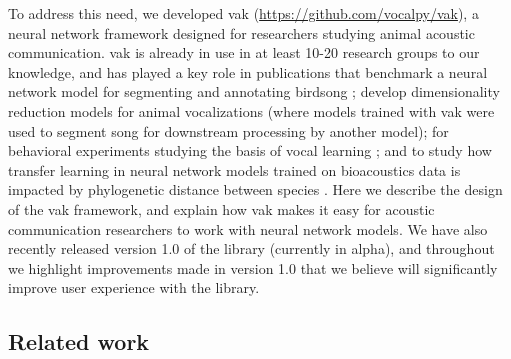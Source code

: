 To address this need, we developed vak \cite{nicholsonVak2022} (\url{https://github.com/vocalpy/vak}), a neural network framework designed for researchers studying animal acoustic communication. vak is already in use in at least 10-20 research groups to our knowledge, and has played a key role in publications that benchmark a neural network model for segmenting and annotating birdsong \cite{cohenAutomatedAnnotationBirdsong2022}; develop dimensionality reduction models for animal vocalizations \cite{goffinetLowdimensionalLearnedFeature2021} (where models trained with vak were used to segment song for downstream processing by another model); for behavioral experiments studying the basis of vocal learning  \cite{mcgregorSharedMechanismsAuditory2022}; and to study how transfer learning in neural network models trained on bioacoustics data is impacted by phylogenetic distance between species \cite{provostImpactsFinetuningPhylogenetic2022}. Here we describe the design of the vak framework, and explain how vak makes it easy for acoustic communication researchers to work with neural network models. We have also recently released version 1.0 of the library (currently in alpha), and throughout we highlight improvements made in version 1.0 that we believe will significantly improve user experience with the library.


\subsection{Related work \label{subsec:related-work}}

